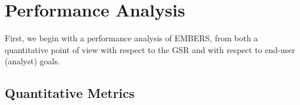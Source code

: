\section{Performance Analysis}
First, we begin with a performance analysis of EMBERS, from both a quantitative
point of view with respect to the GSR and with respect to end-user (analyst) goals.
\subsection{Quantitative Metrics}
\begin{figure}



\end{figure}

